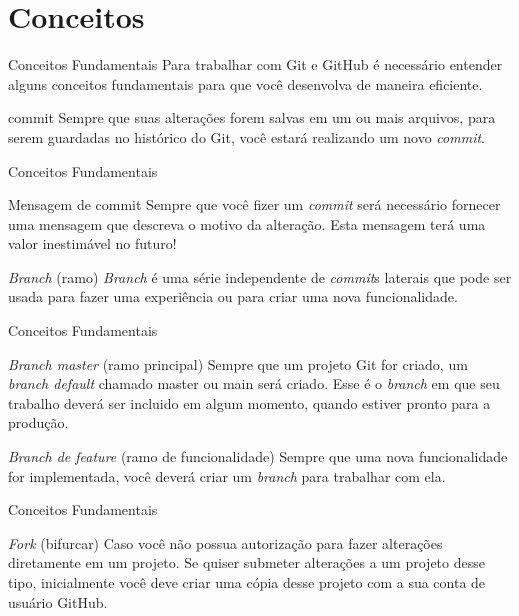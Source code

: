\documentclass{beamer}
\begin{document}
\section{Conceitos}
\begin{frame}{Conceitos Fundamentais}
  Para trabalhar com Git e GitHub é necessário entender alguns conceitos fundamentais para que você desenvolva de maneira eficiente.
\begin{block}{commit}
 Sempre que suas alterações forem salvas em um ou mais arquivos, para serem guardadas no histórico do Git, você estará realizando um novo \textit{commit}.
\end{block}

\end{frame}
\begin{frame}{Conceitos Fundamentais}
\begin{block}{Mensagem de commit}
 Sempre que você fizer um \textit{commit} será necessário fornecer uma mensagem que descreva o motivo da alteração. Esta mensagem terá uma valor inestimável no futuro!
\end{block}
\begin{block}{\textit{Branch} (ramo)}
  \textit{Branch} é uma série independente de \textit{commit}s laterais que pode ser usada para fazer uma experiência ou para criar uma nova funcionalidade.
\end{block}
\end{frame}
\begin{frame}{Conceitos Fundamentais}
\begin{block}{\textit{Branch master}  (ramo principal)}
  Sempre que um projeto Git for criado, um \textit{branch default} chamado master ou main será criado. Esse é o \textit{branch} em que seu trabalho deverá ser incluido em algum momento, quando estiver pronto para a produção.
\end{block}
\begin{block}{\textit{Branch de feature} (ramo de funcionalidade)}
  Sempre que uma nova funcionalidade for implementada, você deverá criar um \textit{branch} para trabalhar com ela.
\end{block}
\end{frame}
\begin{frame}{Conceitos Fundamentais}
\begin{block}{\textit{Fork}  (bifurcar)}
  Caso você não possua autorização para fazer alterações diretamente em um projeto. Se quiser submeter alterações a um projeto desse tipo, inicialmente você deve criar uma cópia desse projeto com a sua conta de usuário GitHub.
\end{block}
\end{frame}
\end{document}
